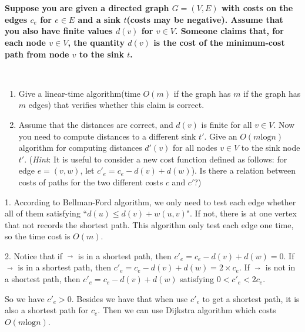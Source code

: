 
\chapter{}
\textbf{
Suppose you are given a directed graph $G=(V,E)$ with costs on the edges $c_e$ for $e\in E$ and a sink $t$(costs may be negative). Assume that you also have finite values $d(v)$ for $v\in V$. Someone claims that, for each node $v\in V$, the quantity $d(v)$ is the cost of the minimum-cost path from node $v$ to the sink $t$.
}

\hspace*{\fill} \\

\begin{enumerate}
  \item Give a linear-time algorithm(time $O(m)$ if the graph has $m$ if the graph has $m$ edges) that verifies whether this claim is correct.
  \item Assume that the distances are correct, and $d(v)$ is finite for all $v\in V$. Now you need to compute distances to a different sink $t'$. Give an $O(m\text{log}n)$ algorithm for computing distances $d'(v)$ for all nodes $v\in V$ to the sink node $t'$. (\emph{Hint}: It is useful to consider a new cost function defined as follows: for edge $e=(v,w)$, let $c'_e=c_e-d(v)+d(w)$). Is there a relation between costs of paths for the two different costs $c$ and $c'$?)
\end{enumerate}

1. According to Bellman-Ford algorithm, we only need to test each edge whether all of them satisfying ``$d(u)\leq d(v)+w(u,v)$". If not, there is at one vertex that not records the shortest path. This algorithm only test each edge one time, so the time cost is $O(m)$.

2. Notice that if $\mathop{(v,w)}\limits^{\longrightarrow}$ is in a shortest path, then $c'_e=c_e-d(v)+d(w)=0$. If $\mathop{(w,v)}\limits^{\longrightarrow}$ is in a shortest path, then $c'_e=c_e-d(v)+d(w)=2\times c_e$. If $\mathop{(v,w)}\limits^{\longrightarrow}$ is not in a shortest path, then $c'_e=c_e-d(v)+d(w)$ satisfying $0<c'_e<2c_e$.

So we have $c'_e>0$. Besides we have that when use $c'_e$ to get a shortest path, it is also a shortest path for $c_e$. Then we can use Dijkstra algorithm which costs $O(m\textrm{log} n)$.






